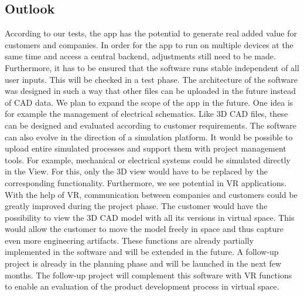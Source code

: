 \subsection*{Outlook}
According to our tests, the app has the potential to generate real added value for customers and companies. In order for the app to run on multiple devices at the same time and access a central backend, adjustments still need to be made. Furthermore, it has to be ensured that the software runs stable independent of all user inputs. This will be checked in a test phase. The architecture of the software was designed in such a way that other files can be uploaded in the future instead of CAD data. We plan to expand the scope of the app in the future. One idea is for example the management of electrical schematics. Like 3D CAD files, these can be designed and evaluated according to customer requirements. The software can also evolve in the direction of a simulation platform. It would be possible to upload entire simulated processes and support them with project management tools. For example, mechanical or electrical systems could be simulated directly in the View. For this, only the 3D view would have to be replaced by the corresponding functionality. Furthermore, we see potential in VR applications. With the help of VR, communication between companies and customers could be greatly improved during the project phase. The customer would have the possibility to view the 3D CAD model with all its versions in virtual space. This would allow the customer to move the model freely in space and thus capture even more engineering artifacts. These functions are already partially implemented in the software and will be extended in the future. A follow-up project is already in the planning phase and will be launched in the next few months. The follow-up project will complement this software with VR functions to enable an evaluation of the product development process in virtual space. 